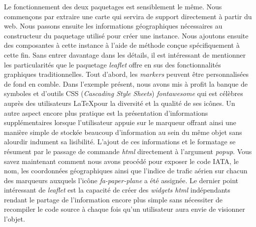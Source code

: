 \vspace{\baselineskip}
Le fonctionnement des deux paquetages est sensiblement le même. Nous commençons par extraire une carte qui servira de support directement à partir du web. Nous passons ensuite les informations géographiques nécessaires au constructeur du paquetage utilisé pour créer une instance. Nous ajoutons ensuite des composantes à cette instance à l'aide de méthode conçue spécifiquement à cette fin. Sans entrer davantage dans les détails, il est intéressant de mentionner les particularités que le paquetage \emph{leaflet} offre en sus des fonctionnalités graphiques traditionnelles. Tout d'abord, les \emph{markers} peuvent être personnalisées de fond en comble. Dans l'exemple présent, nous avons mis à profit la banque de symboles et d'outils CSS (\emph{Cascading Style Sheets}) \emph{fontawesome} \cite{fontAwesome} qui est célèbres auprès des utilisateurs \LaTeX pour la diversité et la qualité de ses icônes. Un autre aspect encore plus pratique est la présentation d'informations supplémentaires lorsque l'utilisateur appuie sur le marqueur offrant ainsi une manière simple de stockée beaucoup d'information au sein du même objet sans alourdir indument sa lisibilité. L'ajout de ces informations et le formatage se résument par le passage de commande \emph{html} directement à l'argument \emph{popup}. Vous savez maintenant comment nous avons procédé pour exposer le code IATA, le nom, les coordonnées géographiques ainsi que l'indice de trafic aérien sur chacun des marqueurs auxquels l'icône \emph{fa-paper-plane} a été assignée. Le dernier point intéressant de \emph{leaflet} est la capacité de créer des \emph{widgets html} indépendants rendant le partage de l'information encore plus simple sans nécessiter de recompiler le code source à chaque fois qu'un utilisateur aura envie de visionner l'objet. \cite{leaflet} \\

